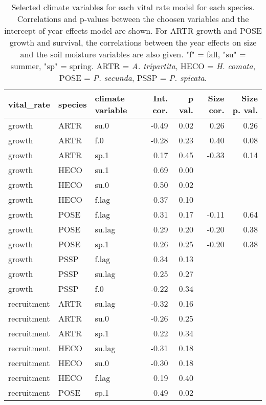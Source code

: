 \begin{table}[ht]
\centering
\caption{Selected climate variables for each vital rate model for each species. Correlations and p-values between the choosen variables and the intercept of year effects model are shown. For ARTR growth and POSE growth and survival, the correlations between the year effects on size and the soil moisture variables are also given. "f" = fall, "su" = summer, "sp" = spring. ARTR = \textit{A. tripartita}, HECO = \textit{H. comata}, POSE = \textit{P. secunda}, PSSP = \textit{P. spicata}.} 
\label{table:strongCor}
\begin{tabular}{lllrrrr}
  \hline
vital\_rate & species & climate variable & Int. cor. & p val. & Size cor. & Size p. val. \\ 
  \hline
growth & ARTR & su.0 & -0.49 & 0.02 & 0.26 & 0.26 \\ 
  growth & ARTR & f.0 & -0.28 & 0.23 & 0.40 & 0.08 \\ 
  growth & ARTR & sp.1 & 0.17 & 0.45 & -0.33 & 0.14 \\ 
  growth & HECO & su.1 & 0.69 & 0.00 &  &  \\ 
  growth & HECO & su.0 & 0.50 & 0.02 &  &  \\ 
  growth & HECO & f.lag & 0.37 & 0.10 &  &  \\ 
  growth & POSE & f.lag & 0.31 & 0.17 & -0.11 & 0.64 \\ 
  growth & POSE & su.lag & 0.29 & 0.20 & -0.20 & 0.38 \\ 
  growth & POSE & sp.1 & 0.26 & 0.25 & -0.20 & 0.38 \\ 
  growth & PSSP & f.lag & 0.34 & 0.13 &  &  \\ 
  growth & PSSP & su.lag & 0.25 & 0.27 &  &  \\ 
  growth & PSSP & f.0 & -0.22 & 0.34 &  &  \\ 
  recruitment & ARTR & su.lag & -0.32 & 0.16 &  &  \\ 
  recruitment & ARTR & su.0 & -0.26 & 0.25 &  &  \\ 
  recruitment & ARTR & sp.1 & 0.22 & 0.34 &  &  \\ 
  recruitment & HECO & su.lag & -0.31 & 0.18 &  &  \\ 
  recruitment & HECO & su.0 & -0.30 & 0.18 &  &  \\ 
  recruitment & HECO & f.lag & 0.19 & 0.40 &  &  \\ 
  recruitment & POSE & sp.1 & 0.49 & 0.02 &  &  \\ 

\end{tabular}
\end{table}

